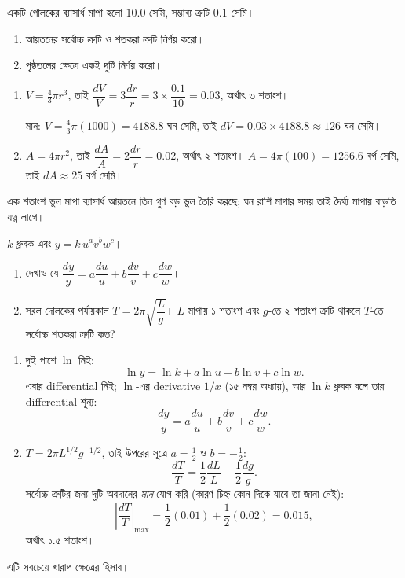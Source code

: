 \documentclass[11pt]{article}
\begin{document}
 একটি গোলকের ব্যাসার্ধ মাপা হলো $10.0$ সেমি, সম্ভাব্য ত্রুটি
$0.1$ সেমি।
\begin{enumerate}
  \item আয়তনের সর্বোচ্চ ত্রুটি ও শতকরা ত্রুটি নির্ণয় করো।
  \item পৃষ্ঠতলের ক্ষেত্রে একই দুটি নির্ণয় করো।
\end{enumerate}

\begin{sol}
\begin{enumerate}
  \item $V = \tfrac{4}{3}\pi r^{3}$, তাই $\dfrac{dV}{V} = 3\dfrac{dr}{r}
        = 3 \times \dfrac{0.1}{10} = 0.03$, অর্থাৎ ৩ শতাংশ।

        মান: $V = \tfrac{4}{3}\pi(1000) = 4188.8$ ঘন সেমি, তাই
        $dV = 0.03 \times 4188.8 \approx 126$ ঘন সেমি।
  \item $A = 4\pi r^{2}$, তাই $\dfrac{dA}{A} = 2\dfrac{dr}{r} = 0.02$,
        অর্থাৎ ২ শতাংশ। $A = 4\pi(100) = 1256.6$ বর্গ সেমি, তাই
        $dA \approx 25$ বর্গ সেমি।
\end{enumerate}
এক শতাংশ ভুল মাপা ব্যাসার্ধ আয়তনে তিন গুণ বড় ভুল তৈরি করছে; ঘন রাশি মাপার
সময় তাই দৈর্ঘ্য মাপায় বাড়তি যত্ন লাগে।
\end{sol}

 $k$ ধ্রুবক এবং $y = k\,u^{a}v^{b}w^{c}$।
\begin{enumerate}
  \item দেখাও যে
        $\dfrac{dy}{y} = a\dfrac{du}{u} + b\dfrac{dv}{v} + c\dfrac{dw}{w}$।
  \item সরল দোলকের পর্যায়কাল $T = 2\pi\sqrt{\dfrac{L}{g}}$। $L$ মাপায়
        ১ শতাংশ এবং $g$-তে ২ শতাংশ ত্রুটি থাকলে $T$-তে সর্বোচ্চ শতকরা
        ত্রুটি কত?
\end{enumerate}

\begin{sol}
\begin{enumerate}
  \item দুই পাশে $\ln$ নিই:
        \[
          \ln y = \ln k + a\ln u + b\ln v + c\ln w .
        \]
        এবার differential নিই; $\ln$-এর derivative $1/x$ (১৫ নম্বর
        অধ্যায়), আর $\ln k$ ধ্রুবক বলে তার differential শূন্য:
        \[
          \frac{dy}{y} = a\frac{du}{u} + b\frac{dv}{v} + c\frac{dw}{w} .
        \]
  \item $T = 2\pi L^{1/2}g^{-1/2}$, তাই উপরের সূত্রে $a = \tfrac{1}{2}$ ও
        $b = -\tfrac{1}{2}$:
        \[
          \frac{dT}{T} = \frac{1}{2}\frac{dL}{L} - \frac{1}{2}\frac{dg}{g} .
        \]
        সর্বোচ্চ ত্রুটির জন্য দুটি অবদানের \emph{মান} যোগ করি (কারণ চিহ্ন
        কোন দিকে যাবে তা জানা নেই):
        \[
          \left| \frac{dT}{T} \right|_{\max}
          = \frac{1}{2}(0.01) + \frac{1}{2}(0.02) = 0.015 ,
        \]
        অর্থাৎ ১.৫ শতাংশ।
\end{enumerate}
এটি সবচেয়ে খারাপ ক্ষেত্রের হিসাব। 
\end{sol}
\end{document}
